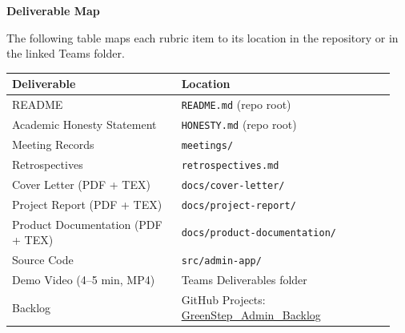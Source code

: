 \documentclass[11pt,letterpaper]{article}
\begin{document}
\vspace{1.5em}

\textbf{Deliverable Map}

The following table maps each rubric item to its location in the repository
or in the linked Teams folder.

\begin{tabular}{@{}p{0.42\linewidth}p{0.53\linewidth}@{}}
\hline
\textbf{Deliverable} & \textbf{Location} \\
\hline
README                          & \texttt{README.md} (repo root) \\
Academic Honesty Statement      & \texttt{HONESTY.md} (repo root) \\
Meeting Records                 & \texttt{meetings/} \\
Retrospectives                  & \texttt{retrospectives.md} \\
Cover Letter (PDF + TEX)        & \texttt{docs/cover-letter/} \\
Project Report (PDF + TEX)      & \texttt{docs/project-report/} \\
Product Documentation (PDF + TEX) & \texttt{docs/product-documentation/} \\
Source Code                     & \texttt{src/admin-app/} \\
Demo Video (4--5 min, MP4)      & Teams Deliverables folder \\
Backlog                         & GitHub Projects: \href{https://github.com/orgs/CISC-480-GreenStep/projects/1}{GreenStep\_Admin\_Backlog} \\
\hline
\end{tabular}
\end{document}
